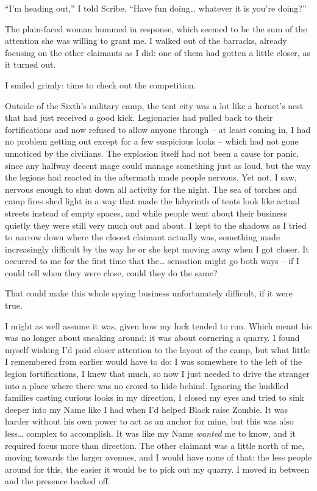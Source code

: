 \documentclass[12pt, openany]{book}
\begin{document}
“I’m heading out,” I told Scribe. “Have fun doing… whatever it is you’re doing?”

The plain-faced woman hummed in response, which seemed to be the sum of the attention she was willing to grant me. I walked out of the barracks, already focusing on the other claimants as I did: one of them had gotten a little closer, as it turned out. 

I smiled grimly: time to check out the competition.

Outside of the Sixth’s military camp, the tent city was a lot like a hornet’s nest that had just received a good kick. Legionaries had pulled back to their fortifications and now refused to allow anyone through – at least coming in, I had no problem getting out except for a few suspicious looks – which had not gone unnoticed by the civilians. The explosion itself had not been a cause for panic, since any halfway decent mage could manage something just as loud, but the way the legions had reacted in the aftermath made people nervous. Yet not, I saw, nervous enough to shut down all activity for the night. The sea of torches and camp fires shed light in a way that made the labyrinth of tents look like actual streets instead of empty spaces, and while people went about their business quietly they were still very much out and about. I kept to the shadows as I tried to narrow down where the closest claimant actually was, something made increasingly difficult by the way he or she kept moving away when I got closer. It occurred to me for the first time that the… sensation might go both ways – if I could tell when they were close, could they do the same?

That could make this whole spying business unfortunately difficult, if it were true.

I might as well assume it was, given how my luck tended to run. Which meant his was no longer about sneaking around: it was about cornering a quarry. I found myself wishing I’d paid closer attention to the layout of the camp, but what little I remembered from earlier would have to do: I was somewhere to the left of the legion fortifications, I knew that much, so now I just needed to drive the stranger into a place where there was no crowd to hide behind. Ignoring the huddled families casting curious looks in my direction, I closed my eyes and tried to sink deeper into my Name like I had when I’d helped Black raise Zombie. It was harder without his own power to act as an anchor for mine, but this was also less… complex to accomplish. It was like my Name \textit{wanted }me to know, and it required focus more than direction. The other claimant was a little north of me, moving towards the larger avenues, and I would have none of that: the less people around for this, the easier it would be to pick out my quarry. I moved in between and the presence backed off.
\end{document}
